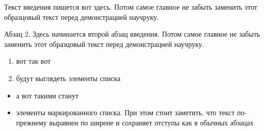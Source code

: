 \label{sec:into}

Текст введения пишется вот здесь. Потом самое главное не забыть заменить этот образцовый текст перед демонстрацией научруку.

Абзац 2. Здесь начинается второй абзац введения. Потом самое главное не забыть заменить этот образцовый текст перед демонстрацией научруку.

\begin{enumerate}
	\item вот так вот
	
	\item будут выглядеть элементы списка
\end{enumerate}

\begin{itemize}
	\item а вот такими станут
	\item элементы маркированного списка. При этом стоит заметить, что текст по-прежнему выравнен по ширене и сохраняет отступы как в обычных абзацах
\end{itemize}